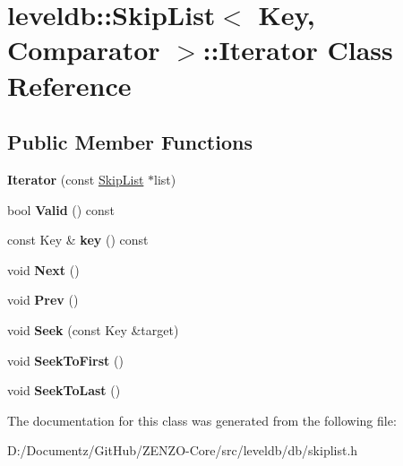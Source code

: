 \hypertarget{classleveldb_1_1_skip_list_1_1_iterator}{}\section{leveldb\+::Skip\+List$<$ Key, Comparator $>$\+::Iterator Class Reference}
\label{classleveldb_1_1_skip_list_1_1_iterator}
\subsection*{Public Member Functions}
\begin{DoxyCompactItemize}
\item 
\mbox{\label{classleveldb_1_1_skip_list_1_1_iterator_ab27d6dd0959d67ed26f2bd451c18270c}} 
{\bfseries Iterator} (const \mbox{\hyperlink{classleveldb_1_1_skip_list}{Skip\+List}} $\ast$list)
\item 
\mbox{\label{classleveldb_1_1_skip_list_1_1_iterator_a6eaf87cf7b2a58908ea3d8f9cccc606f}} 
bool {\bfseries Valid} () const
\item 
\mbox{\label{classleveldb_1_1_skip_list_1_1_iterator_a8b9bc9940fbf067a3fb500ebae6999be}} 
const Key \& {\bfseries key} () const
\item 
\mbox{\label{classleveldb_1_1_skip_list_1_1_iterator_ade5a684c74056f578f85237735da0cef}} 
void {\bfseries Next} ()
\item 
\mbox{\label{classleveldb_1_1_skip_list_1_1_iterator_a10dbaf45640ab2b9f61a96c82e7227e5}} 
void {\bfseries Prev} ()
\item 
\mbox{\label{classleveldb_1_1_skip_list_1_1_iterator_a6c641d5cd37386abdb0aa8d73454611a}} 
void {\bfseries Seek} (const Key \&target)
\item 
\mbox{\label{classleveldb_1_1_skip_list_1_1_iterator_adf69c04f0480a66f10a125c49e19caa7}} 
void {\bfseries Seek\+To\+First} ()
\item 
\mbox{\label{classleveldb_1_1_skip_list_1_1_iterator_afe892ff436137b85216c2ed124f3c6dd}} 
void {\bfseries Seek\+To\+Last} ()
\end{DoxyCompactItemize}


The documentation for this class was generated from the following file\+:\begin{DoxyCompactItemize}
\item 
D\+:/\+Documentz/\+Git\+Hub/\+Z\+E\+N\+Z\+O-\/\+Core/src/leveldb/db/skiplist.\+h\end{DoxyCompactItemize}
